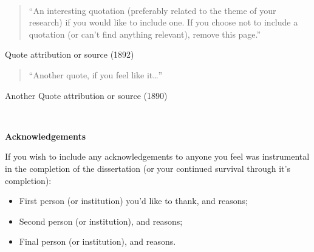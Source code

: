 
\newpage

\ 

\begin{quotation}
``An interesting quotation (preferably related to the theme of your research) if you would like to include one. If you choose not to include a quotation (or can't find anything relevant), remove this page.''
\end{quotation}
\begin{flushright}
Quote attribution or source (1892)
\end{flushright}

\vspace{1cm}

\begin{quotation}
``Another quote, if you feel like it\ldots''
\end{quotation}
\begin{flushright}
Another Quote attribution or source (1890)
\end{flushright}

\ 


\newpage

\begin{center}{\Large\bf Acknowledgements}\end{center}

\vspace{0.3cm}

\noindent If you wish to include any acknowledgements to anyone you feel was instrumental in the completion of the dissertation (or your continued survival through it's completion):
\begin{itemize}
	\item First person (or institution) you'd like to thank, and reasons;

	\item Second person (or institution), and reasons;

	\item Final person (or institution), and reasons.
\end{itemize}


